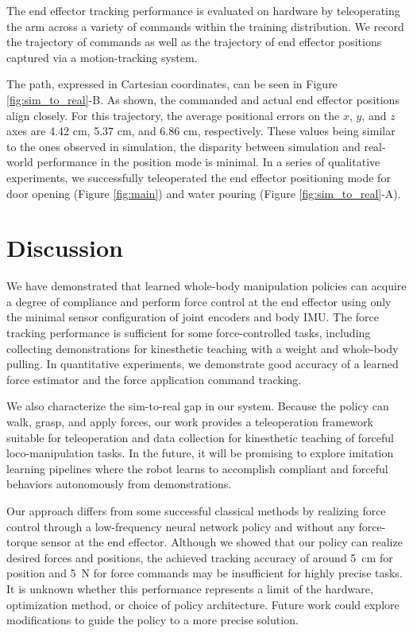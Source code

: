 The end effector tracking performance is evaluated on hardware by teleoperating the arm across a variety of commands within the training distribution. We record the trajectory of commands as well as the trajectory of end effector positions captured via a motion-tracking system. 

The path, expressed in Cartesian coordinates, can be seen in Figure \ref{fig:sim_to_real}-B. As shown, the commanded and actual end effector positions align closely. For this trajectory, the average positional errors on the $x$, $y$, and $z$ axes are 4.42 cm, 5.37 cm, and 6.86 cm, respectively. These values being similar to
the ones observed in simulation, the disparity between simulation and real-world performance in the position mode is minimal. In a series of qualitative experiments, we successfully teleoperated the end effector positioning mode for door opening (Figure \ref{fig:main}) and water pouring (Figure \ref{fig:sim_to_real}-A).


\section{Discussion}

We have demonstrated that learned whole-body manipulation policies can acquire a degree of compliance and perform force control at the end effector using only the minimal sensor configuration of joint encoders and body IMU. The force tracking performance is sufficient for some force-controlled tasks, including collecting demonstrations for kinesthetic teaching with a weight and whole-body pulling. In quantitative experiments, we demonstrate good accuracy of a learned force estimator and the force application command tracking.

We also characterize the sim-to-real gap in our system. Because the policy can walk, grasp, and apply forces, our work provides a teleoperation framework suitable for teleoperation and data collection for kinesthetic teaching of forceful loco-manipulation tasks. In the future, it will be promising to explore imitation learning pipelines where the robot learns to accomplish compliant and forceful behaviors autonomously from demonstrations. 

Our approach differs from some successful classical methods by realizing force control through a low-frequency neural network policy and without any force-torque sensor at the end effector. Although we showed that our policy can realize desired forces and positions, the achieved tracking accuracy of around \SI{5}{\centi\meter} for position and \SI{5}{\newton} for force commands may be insufficient for highly precise tasks. It is unknown whether this performance represents a limit of the hardware, optimization method, or choice of policy architecture. Future work could explore modifications to guide the policy to a more precise solution.  


